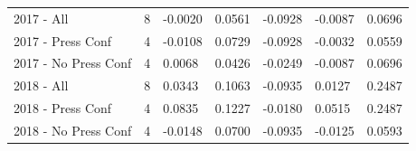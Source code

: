 \begin{table}
\begin{tabular}{lrlllll}
  2017 - All & 8 & -0.0020 & 0.0561 & -0.0928 & -0.0087 & 0.0696 \\
  2017 - Press Conf & 4 & -0.0108 & 0.0729 & -0.0928 & -0.0032 & 0.0559 \\
  2017 - No Press Conf & 4 & 0.0068 & 0.0426 & -0.0249 & -0.0087 & 0.0696 \\
  2018 - All & 8 & 0.0343 & 0.1063 & -0.0935 & 0.0127 & 0.2487 \\
  2018 - Press Conf & 4 & 0.0835 & 0.1227 & -0.0180 & 0.0515 & 0.2487 \\
  2018 - No Press Conf & 4 & -0.0148 & 0.0700 & -0.0935 & -0.0125 & 0.0593 \\
\bottomrule
\end{tabular}
\end{table}
